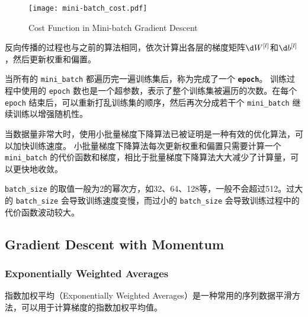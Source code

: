 \begin{figure}[h!bt]
    \centering
    \texttt{[image: mini-batch\_cost.pdf]}
    \caption{Cost Function in Mini-batch Gradient Descent}
    \label{fig:mini-batch_cost}
\end{figure}

反向传播的过程也与之前的算法相同，依次计算出各层的梯度矩阵$\d W^{[l]}$和$\d b^{[l]}$，然后更新权重和偏置。

当所有的 \verb|mini_batch| 都遍历完一遍训练集后，称为完成了一个 \texttt{\textbf{epoch}}。
训练过程中使用的 \verb|epoch| 数也是一个超参数，表示了整个训练集被遍历的次数。在每个 \verb|epoch| 结束后，可以重新打乱训练集的顺序，然后再次分成若干个 \verb|mini_batch| 继续训练以增强随机性。

当数据量非常大时，使用小批量梯度下降算法已被证明是一种有效的优化算法，可以加快训练速度。
小批量梯度下降算法每次更新权重和偏置只需要计算一个 \verb|mini_batch| 的代价函数和梯度，相比于批量梯度下降算法大大减少了计算量，可以更快地收敛。

\verb|batch_size| 的取值一般为2的幂次方，如32、64、128等，一般不会超过512。过大的 \verb|batch_size| 会导致训练速度变慢，而过小的 \verb|batch_size| 会导致训练过程中的代价函数波动较大。

\subsection{Gradient Descent with Momentum}

\subsubsection{Exponentially Weighted Averages}

指数加权平均（Exponentially Weighted Averages）是一种常用的序列数据平滑方法，可以用于计算梯度的指数加权平均值。

